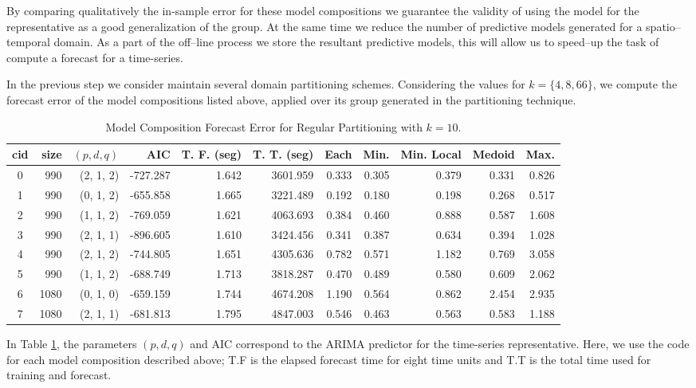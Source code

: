 By comparing qualitatively the in-sample error for these model compositions we guarantee the validity of using the model for the representative as a good generalization of the group. At the same time we reduce the number of predictive models generated for a spatio--temporal domain. As a part of the off--line process we store the resultant predictive models, this will allow us to speed--up the task of compute a forecast for a time-series.

In the previous step we consider maintain several domain partitioning schemes. Considering the values for $k = \{4, 8, 66\}$, we compute the forecast error of the model compositions listed above, applied over its group generated in the partitioning technique. %

\begin{table}[h]
	\centering
	\tiny
	\begin{tabular}{|c|r|r|r|r|r|r|r|r|r|r|}
		\hline
		cid & size & $(p, d, q)$ & AIC & T. F. (seg) & T. T. (seg) & Each & Min. & Min. Local & Medoid & Max. \\
		\hline
		0 &  990 & (2, 1, 2) & -727.287 & 1.642 & 3601.959 & 0.333 & 0.305 & 0.379 & 0.331 & 0.826 \\
		1 &  990 & (0, 1, 2) & -655.858 & 1.665 & 3221.489 & 0.192 & 0.180 & 0.198 & 0.268 & 0.517 \\
		2 &  990 & (1, 1, 2) & -769.059 & 1.621 & 4063.693 & 0.384 & 0.460 & 0.888 & 0.587 & 1.608 \\
		3 &  990 & (2, 1, 1) & -896.605 & 1.610 & 3424.456 & 0.341 & 0.387 & 0.634 & 0.394 & 1.028 \\
		4 &  990 & (2, 1, 2) & -744.805 & 1.651 & 4305.636 & 0.782 & 0.571 & 1.182 & 0.769 & 3.058 \\
		5 &  990 & (1, 1, 2) & -688.749 & 1.713 & 3818.287 & 0.470 & 0.489 & 0.580 & 0.609 & 2.062 \\
		6 & 1080 & (0, 1, 0) & -659.159 & 1.744 & 4674.208 & 1.190 & 0.564 & 0.862 & 2.454 & 2.935 \\
		7 & 1080 & (2, 1, 1) & -681.813 & 1.795 & 4847.003 & 0.546 & 0.463 & 0.563 & 0.583 & 1.188 \\ \hline
	\end{tabular}
	\caption{Model Composition Forecast Error for Regular Partitioning with $k=10$.}
	\label{Table:ForecastErrorRegulark10}
\end{table}

In Table \ref{Table:ForecastErrorRegulark10}, the parameters $(p, d, q)$ and  AIC correspond to the ARIMA predictor for the time-series representative. Here, we use the code for each model composition described above; T.F is the elapsed forecast time for eight time units and T.T is the total time used for training and forecast. 


